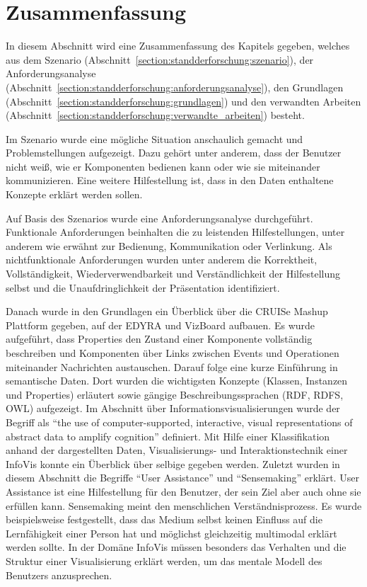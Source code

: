 \documentclass[
	headsepline,
	footsepline,
	fontsize=12pt,
	bibliography=totoc
]{scrbook}
\begin{document}
\section{Zusammenfassung}
\label{section:standderforschung:zusammenfassung}

In diesem Abschnitt wird eine Zusammenfassung des Kapitels gegeben, welches aus dem Szenario (Abschnitt~\ref{section:standderforschung:szenario}), der Anforderungsanalyse (Abschnitt~\ref{section:standderforschung:anforderungsanalyse}), den Grundlagen (Abschnitt~\ref{section:standderforschung:grundlagen}) und den verwandten Arbeiten (Abschnitt~\ref{section:standderforschung:verwandte_arbeiten}) besteht.


Im Szenario wurde eine mögliche Situation anschaulich gemacht und Problemstellungen aufgezeigt. Dazu gehört unter anderem, dass der Benutzer nicht weiß, wie er Komponenten bedienen kann oder wie sie miteinander kommunizieren. Eine weitere Hilfestellung ist, dass in den Daten enthaltene Konzepte erklärt werden sollen. 


Auf Basis des Szenarios wurde eine Anforderungsanalyse durchgeführt. Funktionale Anforderungen beinhalten die zu leistenden Hilfestellungen, unter anderem wie erwähnt zur Bedienung, Kommunikation oder Verlinkung. Als nichtfunktionale Anforderungen wurden unter anderem die Korrektheit, Vollständigkeit, Wiederverwendbarkeit und Verständlichkeit der Hilfestellung selbst und die Unaufdringlichkeit der Präsentation identifiziert.


Danach wurde in den Grundlagen ein Überblick über die CRUISe Mashup Plattform gegeben, auf der EDYRA und VizBoard aufbauen. Es wurde aufgeführt, dass Properties den Zustand einer Komponente vollständig beschreiben und Komponenten über Links zwischen Events und Operationen miteinander Nachrichten austauschen. Darauf folge eine kurze Einführung in semantische Daten. Dort wurden die wichtigsten Konzepte (Klassen, Instanzen und Properties) erläutert sowie gängige Beschreibungssprachen (RDF, RDFS, OWL) aufgezeigt. Im Abschnitt über Informationsvisualisierungen wurde der Begriff als \enquote{the use of computer-supported, interactive, visual representations of abstract data to amplify cognition} definiert. Mit Hilfe einer Klassifikation anhand der dargestellten Daten, Visualisierungs- und Interaktionstechnik einer InfoVis konnte ein Überblick über selbige gegeben werden. Zuletzt wurden in diesem Abschnitt die Begriffe \enquote{User Assistance} und \enquote{Sensemaking} erklärt. User Assistance ist eine Hilfestellung für den Benutzer, der sein Ziel aber auch ohne sie erfüllen kann. Sensemaking meint den menschlichen Verständnisprozess. Es wurde beispielsweise festgestellt, dass das Medium selbst keinen Einfluss auf die Lernfähigkeit einer Person hat und möglichst gleichzeitig multimodal erklärt werden sollte. In der Domäne InfoVis müssen besonders das Verhalten und die Struktur einer Visualisierung erklärt werden, um das mentale Modell des Benutzers anzusprechen.
\end{document}
